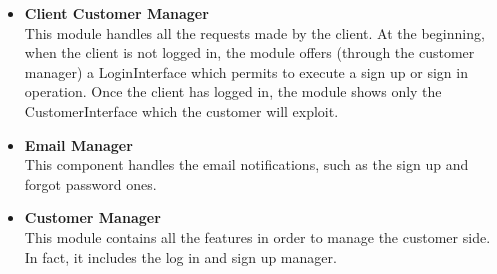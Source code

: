 \begin{itemize}
    \item \textbf{Client Customer Manager}\\This module handles all the requests made by the client. At the beginning, when the client is not logged in, the module offers (through the customer manager) a LoginInterface which permits to execute a sign up or sign in operation. Once the client has logged in, the module shows only the CustomerInterface which the customer will exploit.
    \item \textbf{Email Manager}\\This component handles the email notifications, such as the sign up and forgot password ones.
    \item \textbf{Customer Manager}\\This module contains all the features in order to manage the customer side. In fact, it includes the log in and sign up manager.
    

\end{itemize}
